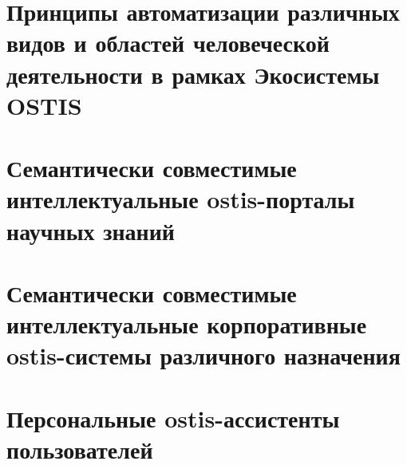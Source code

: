 \section{Принципы автоматизации различных видов и областей человеческой деятельности в рамках Экосистемы OSTIS}
{\label{sec_ecosystem_automation_principles}} 


\section{Семантически совместимые интеллектуальные ostis-порталы научных знаний}
{\label{sec_ostis_scientific_portal}} 


\section{Семантически совместимые интеллектуальные корпоративные ostis-системы различного назначения}
{\label{sec_corporate_ostis_system}} 


\section{Персональные ostis-ассистенты пользователей}
{\label{sec_ostis_assistant}} 


%